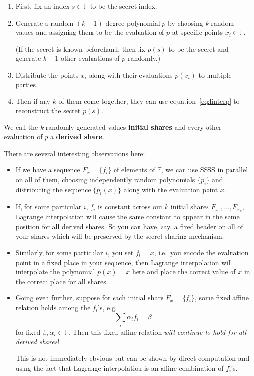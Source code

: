 \documentclass[letterpaper]{article}
\begin{document}
\begin{enumerate}
\item First, fix an index $s\in \mathbb{F}$ to be the secret index.
\item Generate a random $(k-1)$-degree polynomial $p$ by choosing $k$
random values and assigning them to be the evaluation of $p$ at specific
points $x_i\in \mathbb{F}$.

(If the secret is known beforehand, then fix $p(s)$ to be the secret
and generate $k-1$ other evaluations of $p$ randomly.)
\item Distribute the points $x_i$ along with their evaluations $p(x_i)$
to multiple parties.
\item Then if any $k$ of them come together, they can use equation~\eqref{eq:linterp}
to reconstruct the secret $p(s)$.
\end{enumerate}

We call the $k$ randomly generated values \textbf{initial shares} and
every other evaluation of $p$ a \textbf{derived share}.

There are several interesting observations here:
\begin{itemize}
\item If we have a sequence $F_x = \{f_i\}$ of elements of $\mathbb{F}$, we can use
SSSS in parallel on all of them, choosing independently random polynomials
$\{p_i\}$ and distributing the sequence $\{p_i(x)\}$ along with the evaluation
point $x$.
\item If, for some particular $i$, $f_i$ is constant across our $k$ initial
shares $F_{x_1},\ldots,F_{x_k}$, Lagrange interpolation will cause the same
constant to appear in the same position for all derived shares. So you can
have, say, a fixed header on all of your shares which will be preserved by
the secret-sharing mechanism.
\item Similarly, for some particular $i$, you set $f_i=x$, i.e.~you encode the
evaluation point in a fixed place in your sequence, then Lagrange interpolation
will interpolate the polynomial $p(x) = x$ here and place the correct value
of $x$ in the correct place for all shares.
\item Going even further, suppose for each initial share $F_x=\{f_i\}$, some fixed
affine relation holds among the $f_i$'s, e.g.
\[ \sum_i \alpha_i f_i = \beta \]
for fixed $\beta,\alpha_i\in \mathbb{F}$. Then this fixed affine relation
\emph{will continue to hold for all derived shares}!

This is not immediately obvious but can be shown by direct computation and
using the fact that Lagrange interpolation is an affine combination of $f_i$'s.
\end{itemize}
\end{document}
